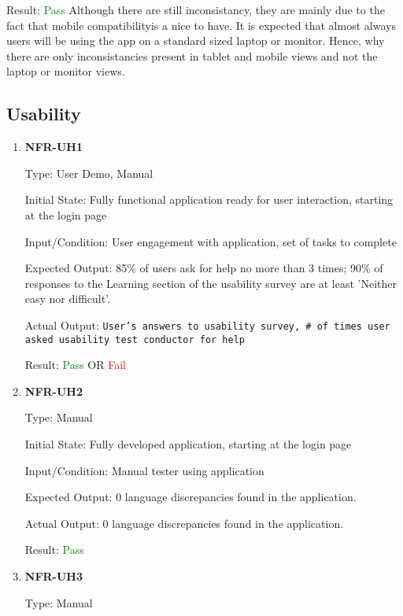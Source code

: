 \documentclass[12pt, titlepage]{article}
\begin{document}
\begin{enumerate}
Result: \textcolor{green}{Pass} \newline
Although there are still inconsistancy, they are
mainly due to the fact that mobile compatibilityis a nice to have. It is
expected that almost always users will be using the app on a standard sized
laptop or monitor. Hence, why there are only inconsistancies present in tablet
and mobile views and not the laptop or monitor views. \end{enumerate}

\subsection{Usability}
\begin{enumerate}
\item{\textbf{NFR-UH1}} \label{NFR:UH1}

Type: User Demo, Manual

Initial State: Fully functional application ready for user interaction, starting
at the login page

Input/Condition: User engagement with application, set of tasks to complete

Expected Output: 85\% of users ask for help no more than 3 times; 90\% of
responses to the Learning section of the usability survey are at least 'Neither
easy nor difficult'.

Actual Output: \texttt{User's answers to usability survey, \# of times user
asked usability test conductor for help}

Result: \textcolor{green}{Pass} OR \textcolor{red}{Fail}

\item{\textbf{NFR-UH2}} \label{NFR:UH2}

Type: Manual
  
Initial State: Fully developed application, starting at the login page
  
Input/Condition: Manual tester using application

Expected Output: 0 language discrepancies found in the application.
  
Actual Output: 0 language discrepancies found in the application.

Result: \textcolor{green}{Pass}

\item{\textbf{NFR-UH3}} \label{NFR:UH3}

Type: Manual


\end{enumerate}
\end{document}
